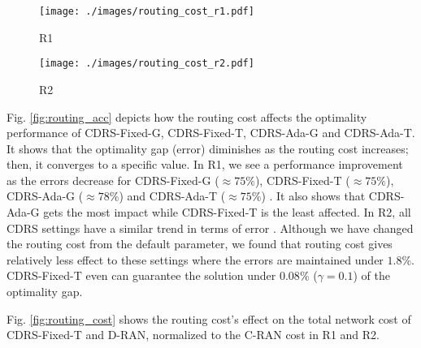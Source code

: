 \begin{figure*}[t] 
	\centering
	\begin{subfigure}[t]{.375\textwidth}
		\centering
		\texttt{[image: ./images/routing\_cost\_r1.pdf]}
		\small\caption{\small R1}
	\end{subfigure}
	\begin{subfigure}[t]{.375\textwidth}
		\centering
		\texttt{[image: ./images/routing\_cost\_r2.pdf]}
		\small\caption{\small R2}
	\end{subfigure}		
	\caption{\small \textbf{Impact of routing cost to the total cost in (a) R1 and (b) R2.} We also compare our approach (e.g., CDRS-Fixed-T) to two extreme cases: fully D-RAN and C-RAN, and the optimal value with the routing cost scaling from 0.1 to 1 of default R1 and R2. The presented cost above is normalized toward fully C-RAN cost.} \label{fig:routing_cost}
	\vspace{-3mm}
\end{figure*}


Fig. \ref{fig:routing_acc} depicts how the routing cost affects the optimality performance of CDRS-Fixed-G, CDRS-Fixed-T, CDRS-Ada-G and CDRS-Ada-T. It shows that the  optimality gap (error) diminishes as the routing cost increases; then, it converges to a specific value. In R1, we see a performance improvement as the errors decrease for CDRS-Fixed-G ($\approx75\%$), CDRS-Fixed-T ($\approx75\%$), CDRS-Ada-G ($\approx78\%$) and CDRS-Ada-T ($\approx75\%$) . It also shows that CDRS-Ada-G gets the most impact while CDRS-Fixed-T is the least affected. In R2, all CDRS settings  have a similar trend in terms of error . Although we have changed the routing cost from the default parameter, we found that  routing cost gives relatively less effect to these settings where the errors are maintained under $1.8 \%$. CDRS-Fixed-T even can guarantee the solution under $0.08 \%$ ($\gamma  = 0.1$) of the optimality gap.



Fig. \ref{fig:routing_cost} shows the routing cost's effect on the total network cost of CDRS-Fixed-T and D-RAN, normalized to the C-RAN cost in R1 and R2. 
%

